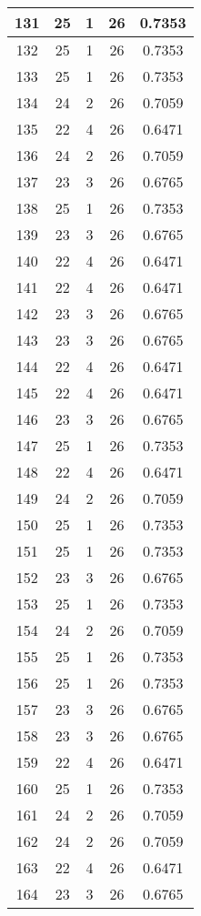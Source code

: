 \documentclass[letterpaper, 12pt]{article}
\begin{document}
\begin{longtable}{|c|c|c|c|c|}
\hline
131 & 25 & 1 & 26 & 0.7353 \\
\hline
132 & 25 & 1 & 26 & 0.7353 \\
\hline
133 & 25 & 1 & 26 & 0.7353 \\
\hline
134 & 24 & 2 & 26 & 0.7059 \\
\hline
135 & 22 & 4 & 26 & 0.6471 \\
\hline
136 & 24 & 2 & 26 & 0.7059 \\
\hline
137 & 23 & 3 & 26 & 0.6765 \\
\hline
138 & 25 & 1 & 26 & 0.7353 \\
\hline
139 & 23 & 3 & 26 & 0.6765 \\
\hline
140 & 22 & 4 & 26 & 0.6471 \\
\hline
141 & 22 & 4 & 26 & 0.6471 \\
\hline
142 & 23 & 3 & 26 & 0.6765 \\
\hline
143 & 23 & 3 & 26 & 0.6765 \\
\hline
144 & 22 & 4 & 26 & 0.6471 \\
\hline
145 & 22 & 4 & 26 & 0.6471 \\
\hline
146 & 23 & 3 & 26 & 0.6765 \\
\hline
147 & 25 & 1 & 26 & 0.7353 \\
\hline
148 & 22 & 4 & 26 & 0.6471 \\
\hline
149 & 24 & 2 & 26 & 0.7059 \\
\hline
150 & 25 & 1 & 26 & 0.7353 \\
\hline
151 & 25 & 1 & 26 & 0.7353 \\
\hline
152 & 23 & 3 & 26 & 0.6765 \\
\hline
153 & 25 & 1 & 26 & 0.7353 \\
\hline
154 & 24 & 2 & 26 & 0.7059 \\
\hline
155 & 25 & 1 & 26 & 0.7353 \\
\hline
156 & 25 & 1 & 26 & 0.7353 \\
\hline
157 & 23 & 3 & 26 & 0.6765 \\
\hline
158 & 23 & 3 & 26 & 0.6765 \\
\hline
159 & 22 & 4 & 26 & 0.6471 \\
\hline
160 & 25 & 1 & 26 & 0.7353 \\
\hline
161 & 24 & 2 & 26 & 0.7059 \\
\hline
162 & 24 & 2 & 26 & 0.7059 \\
\hline
163 & 22 & 4 & 26 & 0.6471 \\
\hline
164 & 23 & 3 & 26 & 0.6765 \\

\end{longtable}
\end{document}
